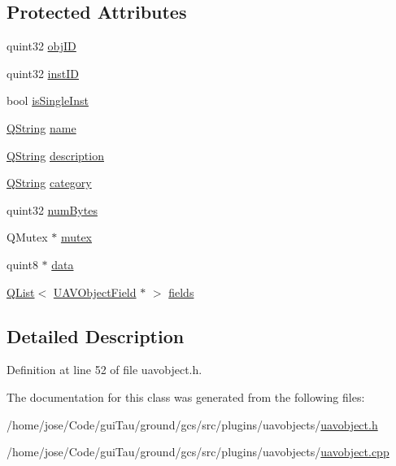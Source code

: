 \subsection*{Protected Attributes}
\begin{DoxyCompactItemize}
\item 
quint32 \hyperlink{group___u_a_v_objects_plugin_gafc50acdaa311c9fd9aaddf90fd578c14}{obj\-I\-D}
\item 
quint32 \hyperlink{group___u_a_v_objects_plugin_gad8d656542a04e9fbef607ff178f6d9d3}{inst\-I\-D}
\item 
bool \hyperlink{group___u_a_v_objects_plugin_gaa279cad3a000cc930e7f386672426bcb}{is\-Single\-Inst}
\item 
\hyperlink{group___u_a_v_objects_plugin_gab9d252f49c333c94a72f97ce3105a32d}{Q\-String} \hyperlink{group___u_a_v_objects_plugin_gadf898ed0961464f4a3f8e05fb28019f5}{name}
\item 
\hyperlink{group___u_a_v_objects_plugin_gab9d252f49c333c94a72f97ce3105a32d}{Q\-String} \hyperlink{group___u_a_v_objects_plugin_gaeeb0e865791ad6b21d83ef571d1ce48b}{description}
\item 
\hyperlink{group___u_a_v_objects_plugin_gab9d252f49c333c94a72f97ce3105a32d}{Q\-String} \hyperlink{group___u_a_v_objects_plugin_gae96da3f59e51fb5c3ca43056bda4a63e}{category}
\item 
quint32 \hyperlink{group___u_a_v_objects_plugin_ga260cfb19e663f64d51ba1258e760a207}{num\-Bytes}
\item 
Q\-Mutex $\ast$ \hyperlink{group___u_a_v_objects_plugin_gacf8a1ff5bac6d34fc1d7192a86194361}{mutex}
\item 
quint8 $\ast$ \hyperlink{group___u_a_v_objects_plugin_gadb2f4800bd3b6fb89c0f7c9fb67e49ff}{data}
\item 
\hyperlink{class_q_list}{Q\-List}$<$ \hyperlink{class_u_a_v_object_field}{U\-A\-V\-Object\-Field} $\ast$ $>$ \hyperlink{group___u_a_v_objects_plugin_gaafc65699167bc5cedfd058400e484df6}{fields}
\end{DoxyCompactItemize}


\subsection{Detailed Description}


Definition at line 52 of file uavobject.\-h.



The documentation for this class was generated from the following files\-:\begin{DoxyCompactItemize}
\item 
/home/jose/\-Code/gui\-Tau/ground/gcs/src/plugins/uavobjects/\hyperlink{uavobject_8h}{uavobject.\-h}\item 
/home/jose/\-Code/gui\-Tau/ground/gcs/src/plugins/uavobjects/\hyperlink{uavobject_8cpp}{uavobject.\-cpp}\end{DoxyCompactItemize}
